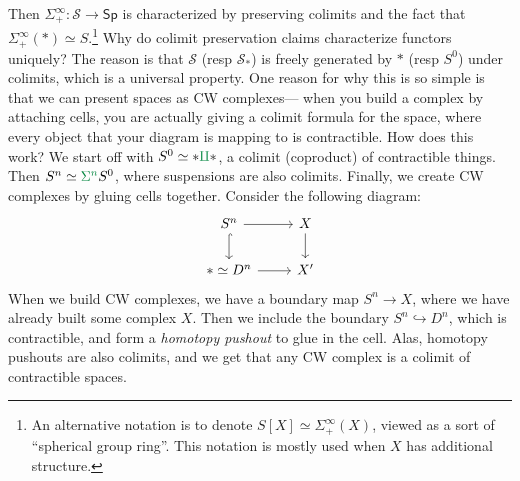 Then $\Sigma ^{\infty}_+ \colon \mathcal{S}  \to \mathsf{Sp} $ is characterized by preserving colimits and the fact that $\Sigma ^{\infty}_+ (*)\simeq S$.\footnote{An alternative notation is to denote $S[X]\simeq \Sigma ^{\infty}_+(X)$, viewed as a sort of ``spherical group ring''. This notation is mostly used when $X$ has additional structure.} Why do colimit preservation claims characterize functors uniquely? The reason is that $\mathcal{S} $ (resp $\mathcal{S} _*$) is freely generated by $*$ (resp $S^0$) under colimits, which is a universal property. One reason for why this is so simple is that we can present spaces as CW complexes--- when you build a complex by attaching cells, you are actually giving a colimit formula for the space, where every object that your diagram is mapping to is contractible. How does this work? We start off with $S^0 \simeq * {\color{meangreen}\amalg } *$, a {\color{meangreen}colimit} (coproduct) of contractible things. Then $S^n \simeq {\color{meangreen}\Sigma ^n} S^0$, where suspensions are also {\color{meangreen}colimits}. Finally, we create CW complexes by gluing cells together. Consider the following diagram: \[
\begin{tikzcd}
    S^n \arrow[r]\arrow[d,hook] & X \arrow[d] \\
    *\simeq D^n \arrow[r] & X'
\end{tikzcd}
\] When we build CW complexes, we have a boundary map $S^n \to X$, where we have already built some complex $X$. Then we include the boundary $S^n  \hookrightarrow D^n $, which is contractible, and form a \emph{homotopy pushout} to glue in the cell. Alas, homotopy pushouts are also {\color{meangreen}colimits}, and we get that any CW complex is a colimit of contractible spaces.

